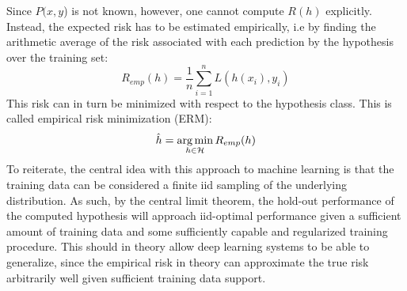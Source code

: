 		Since \(P(x,y\)) is not known, however, one cannot compute \(R(h)\) explicitly. Instead, the expected risk has to be estimated empirically, i.e by finding the arithmetic average of the risk associated with each prediction by the hypothesis over the training set:
		\begin{equation}
		R_{emp}(h) = \frac{1}{n}\sum_{i=1}^{n}L(h(x_i), y_i)
		\end{equation}
		This risk can in turn be minimized with respect to the hypothesis class. This is called empirical risk minimization (ERM):
		\begin{equation}
		\hat{h} = \operatorname*{arg\,min}_{h \in \mathcal{H}}R_{emp}(h)
		\end{equation}
		To reiterate, the central idea with this approach to machine learning is that the training data can be considered a finite iid sampling of the underlying distribution. As such, by the central limit theorem, the hold-out performance of the computed hypothesis will approach iid-optimal performance given a sufficient amount of training data and some sufficiently capable and regularized training procedure. This should in theory allow deep learning systems to be able to generalize, since the empirical risk in theory can approximate the true risk arbitrarily well given sufficient training data support.
